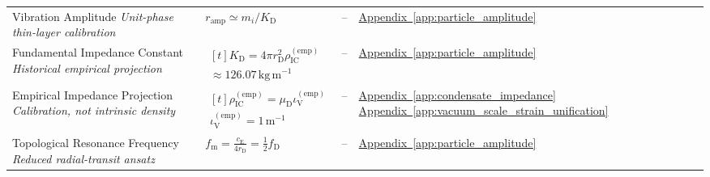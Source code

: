 \begin{longtable}{@{} p{4.5cm} p{6cm} c p{4cm} @{}}
{\raggedright Vibration Amplitude \newline \textit{Unit-phase thin-layer calibration}\par} & {\raggedright $r_{\mathrm{amp}}\simeq m_i/K_{\mathrm D}$\par} & -- & {\raggedright \hyperref[app:particle_amplitude]{Appendix~\ref*{app:particle_amplitude}}\par} \\

{\raggedright Fundamental Impedance Constant \newline \textit{Historical empirical projection}\par} & {\raggedright $\begin{gathered}[t]K_{\mathrm D}=4\pi r_{\mathrm D}^2\rho_{\mathrm{IC}}^{(\mathrm{emp})} \\ \approx126.07\,\mathrm{kg\,m^{-1}}\end{gathered}$\par} & -- & {\raggedright \hyperref[app:particle_amplitude]{Appendix~\ref*{app:particle_amplitude}}\par} \\

{\raggedright Empirical Impedance Projection \newline \textit{Calibration, not intrinsic density}\par} & {\raggedright $\begin{gathered}[t]\rho_{\mathrm{IC}}^{(\mathrm{emp})}=\mu_{\mathrm D}\iota_{\mathrm V}^{(\mathrm{emp})} \\ \iota_{\mathrm V}^{(\mathrm{emp})}=1\,\mathrm{m^{-1}}\end{gathered}$\par} & -- & {\raggedright \hyperref[app:condensate_impedance]{Appendix~\ref*{app:condensate_impedance}} \newline \hyperref[app:vacuum_scale_strain_unification]{Appendix~\ref*{app:vacuum_scale_strain_unification}}\par} \\

{\raggedright Topological Resonance Frequency \newline \textit{Reduced radial-transit ansatz}\par} & {\raggedright $f_{\mathrm{m}} = \frac{c_{\mathrm{E}}}{4r_{\mathrm{D}}} = \frac{1}{2} f_{\mathrm{D}}$\par} & -- & {\raggedright \hyperref[app:particle_amplitude]{Appendix~\ref*{app:particle_amplitude}}\par} \\


\end{longtable}
